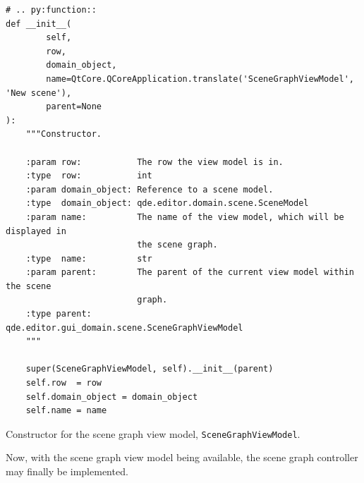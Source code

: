 \documentclass[10pt, openright, notitlepage]{scrreprt}
\begin{document}
\begin{listing}[H]
\begin{verbatim}
# .. py:function::
def __init__(
        self,
        row,
        domain_object,
        name=QtCore.QCoreApplication.translate('SceneGraphViewModel', 'New scene'),
        parent=None
):
    """Constructor.

    :param row:           The row the view model is in.
    :type  row:           int
    :param domain_object: Reference to a scene model.
    :type  domain_object: qde.editor.domain.scene.SceneModel
    :param name:          The name of the view model, which will be displayed in
                          the scene graph.
    :type  name:          str
    :param parent:        The parent of the current view model within the scene
                          graph.
    :type parent:         qde.editor.gui_domain.scene.SceneGraphViewModel
    """

    super(SceneGraphViewModel, self).__init__(parent)
    self.row  = row
    self.domain_object = domain_object
    self.name = name
\end{verbatim}
\caption{\label{guidomain-scene-scenegraphviewmodel-constructor}
Constructor for the scene graph view model, \texttt{SceneGraphViewModel}.}
\end{listing}

Now, with the scene graph view model being available, the scene graph controller
may finally be implemented.
\end{document}

